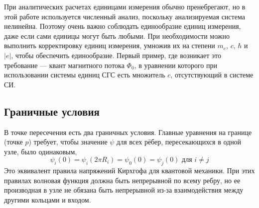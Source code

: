 \documentclass[A4,12pt,oneside]{article}
\renewcommand{\(}{\left(}
\renewcommand{\)}{\right)}
\begin{document}
При аналитических расчетах единицами измерения обычно пренебрегают, но в этой работе используется численный анализ, поскольку анализируемая система нелинейна. Поэтому очень важно соблюдать единообразие единиц измерения, даже если сами единицы могут быть любыми. При необходимости можно выполнить корректировку единиц измерения, умножив их на степени $m_e$, $c$, $\hbar$ и $\left|e\right|$, чтобы обеспечить единообразие. Первый пример, где возникает это требование — квант магнитного потока $\Phi_0$, в уравнении которого при использовании системы единиц СГС есть множитель $c$, отсутствующий в системе СИ.

\subsection{Граничные условия}
В точке пересечения есть два граничных условия.
Главные уравнения на границе (точке $p$) требует, чтобы значение $\psi$ для всех рёбер, пересекающихся в одной узле, было одинаковым,
\begin{equation}
\psi_i\left(0\right) = \psi_i\left(2\pi R_i\right) = \psi_0\left(0\right) = \psi_j\left(0\right)  \text{ для } i \neq j
\end{equation}
Это эквивалент правила напряжений Кирхгофа для квантовой механики.  
При этих правилах волновая функция должна быть непрерывной по всему ребру, но ее производная в узле не обязана быть непрерывной из-за взаимодействия между другими кольцами и входом.
\end{document}

